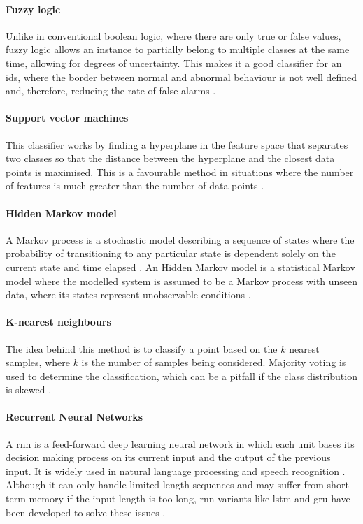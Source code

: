 \paragraph{Fuzzy logic}
Unlike in conventional boolean logic, where there are only true or false values, fuzzy logic allows an instance to partially belong to multiple classes at the same time, allowing for degrees of uncertainty. This makes it a good classifier for an \gls{ids}, where the border between normal and abnormal behaviour is not well defined and, therefore, reducing the rate of false alarms \citep{Khraisat2019}.

\paragraph{Support vector machines}
This classifier works by finding a hyperplane in the feature space that separates two classes so that the distance between the hyperplane and the closest data points is maximised. This is a favourable method in situations where the number of features is much greater than the number of data points \citep{Buczak2016}.

\paragraph{Hidden Markov model}
A Markov process is a stochastic model describing a sequence of states where the probability of transitioning to any particular state is dependent solely on the current state and time elapsed \citep{Maltby}. An Hidden Markov model is a statistical Markov model where the modelled system is assumed to be a Markov process with unseen data, where its states represent unobservable conditions \citep{Buczak2016}.

\paragraph{K-nearest neighbours}
The idea behind this method is to classify a point based on the $k$ nearest samples, where $k$ is the number of samples being considered. Majority voting is used to determine the classification, which can be a pitfall if the class distribution is skewed \citep{Buczak2016}.

\paragraph{Recurrent Neural Networks}
A \gls{rnn} is a feed-forward deep learning neural network in which each unit bases its decision making process on its current input and the output of the previous input. It is widely used in natural language processing and speech recognition \citep{ibmDeepLearning}. Although it can only handle limited length sequences and may suffer from short-term memory if the input length is too long, \gls{rnn} variants like \gls{lstm} and \gls{gru} have been developed to solve these issues \citep{ahmad2021network}.

